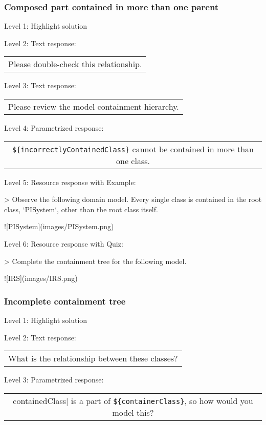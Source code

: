 \subsubsection{Composed part contained in more than one parent}

\noindent Level 1: Highlight solution \medskip

\noindent Level 2: Text response: \medskip

\begin{tabular}{|c}
Please double-check this relationship.
\end{tabular} \medskip

\noindent Level 3: Text response: \medskip

\begin{tabular}{|c}
Please review the model containment hierarchy.
\end{tabular} \medskip

\noindent Level 4: Parametrized response: \medskip

\begin{tabular}{|c}
\verb|${incorrectlyContainedClass}| cannot be contained in more than one class.
\end{tabular} \medskip

\noindent Level 5: Resource response with Example:

> Observe the following domain model. Every single class is contained in the 
root class, `PISystem`, other than the root class itself.

![PISystem](images/PISystem.png)

\noindent Level 6: Resource response with Quiz:

> Complete the containment tree for the following model.

![IRS](images/IRS.png)


\subsubsection{Incomplete containment tree}

\noindent Level 1: Highlight solution \medskip

\noindent Level 2: Text response: \medskip

\begin{tabular}{|c}
What is the relationship between these classes?
\end{tabular} \medskip

\noindent Level 3: Parametrized response: \medskip

\begin{tabular}{|c}
{containedClass}| is a part of \verb|${containerClass}|, so how would you model this?
\end{tabular} \medskip

